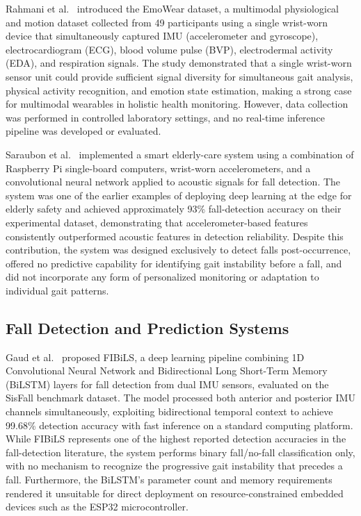 \documentclass[conference]{IEEEtran}
\begin{document}
Rahmani et al.~\cite{rahmani2024} introduced the EmoWear dataset, a
multimodal physiological and motion dataset collected from 49 participants
using a single wrist-worn device that simultaneously captured IMU
(accelerometer and gyroscope), electrocardiogram (ECG), blood volume pulse
(BVP), electrodermal activity (EDA), and respiration signals. The study
demonstrated that a single wrist-worn sensor unit could provide sufficient
signal diversity for simultaneous gait analysis, physical activity
recognition, and emotion state estimation, making a strong case for
multimodal wearables in holistic health monitoring. However, data collection
was performed in controlled laboratory settings, and no real-time inference
pipeline was developed or evaluated.

Saraubon et al.~\cite{saraubon2018} implemented a smart elderly-care system
using a combination of Raspberry Pi single-board computers, wrist-worn
accelerometers, and a convolutional neural network applied to acoustic
signals for fall detection. The system was one of the earlier examples of
deploying deep learning at the edge for elderly safety and achieved
approximately 93\% fall-detection accuracy on their experimental dataset,
demonstrating that accelerometer-based features consistently outperformed
acoustic features in detection reliability. Despite this contribution, the
system was designed exclusively to detect falls post-occurrence, offered
no predictive capability for identifying gait instability before a fall, and
did not incorporate any form of personalized monitoring or adaptation to
individual gait patterns.

\subsection{Fall Detection and Prediction Systems}

Gaud et al.~\cite{gaud2025} proposed FIBiLS, a deep learning pipeline
combining 1D Convolutional Neural Network and Bidirectional Long Short-Term
Memory (BiLSTM) layers for fall detection from dual IMU sensors, evaluated
on the SisFall benchmark dataset. The model processed both anterior and
posterior IMU channels simultaneously, exploiting bidirectional temporal
context to achieve 99.68\% detection accuracy with fast inference on a
standard computing platform. While FIBiLS represents one of the highest
reported detection accuracies in the fall-detection literature, the system
performs binary fall/no-fall classification only, with no mechanism to
recognize the progressive gait instability that precedes a fall. Furthermore,
the BiLSTM's parameter count and memory requirements rendered it unsuitable
for direct deployment on resource-constrained embedded devices such as the
ESP32 microcontroller.
\end{document}
